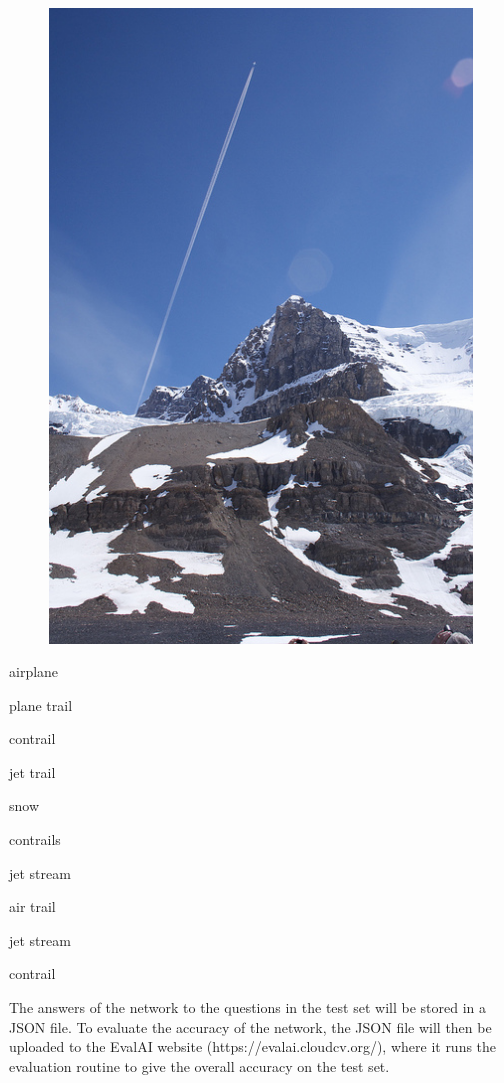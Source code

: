 \documentclass[12pt]{article}
\begin{document}
\begin{itemize}
	\begin{minipage}{\linewidth}
		\begin{figure}
			\item[] \begin{center}
				\includegraphics[width=\linewidth]{whitetrail}
			\end{center}
		\end{figure}
		\-
	\end{minipage}
	\item airplane
	\item plane trail
	\item contrail
	\item jet trail 
	\item snow
	\item contrails
	\item jet stream
	\item air trail 
	\item jet stream
	\item contrail
\end{itemize}
\vskip 10.0mm
The answers of the network to the questions in the test set will be stored in a JSON file. To evaluate the accuracy of the network, the JSON file will then be uploaded to the EvalAI website (https://evalai.cloudcv.org/), where it runs the evaluation routine to give the overall accuracy on the test set. 
\end{document}
